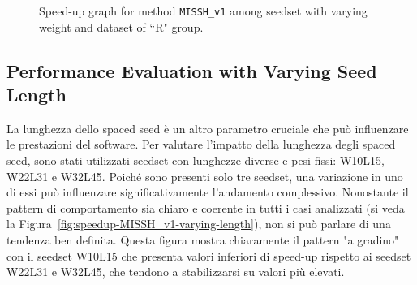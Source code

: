 	\begin{figure}[!ht]
		\centering
		\caption{Speed-up graph for method \texttt{MISSH\_v1} among seedset with varying weight and dataset of “R" group.}
		\label{fig:speedup-MISSH_v1-varying-weight-R}
	\end{figure}




	\subsection{Performance Evaluation with Varying Seed Length}
	\label{subsec:performance-varying-seed-length}
	
	La lunghezza dello spaced seed è un altro parametro cruciale che può influenzare le prestazioni del software. Per valutare l'impatto della lunghezza degli spaced seed, sono stati utilizzati seedset con lunghezze diverse e pesi fissi: W10L15, W22L31 e W32L45. Poiché sono presenti solo tre seedset, una variazione in uno di essi può influenzare significativamente l'andamento complessivo. Nonostante il pattern di comportamento sia chiaro e coerente in tutti i casi analizzati (si veda la Figura~\ref{fig:speedup-MISSH_v1-varying-length}), non si può parlare di una tendenza ben definita. Questa figura mostra chiaramente il pattern "a gradino" con il seedset W10L15 che presenta valori inferiori di speed-up rispetto ai seedset W22L31 e W32L45, che tendono a stabilizzarsi su valori più elevati.
	
